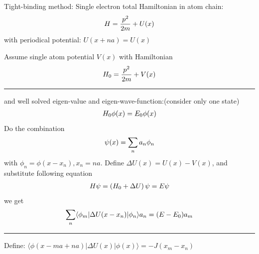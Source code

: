 \documentclass[letterpaper,10pt,english]{sphinxmanual}
\begin{document}
Tight-binding method: Single electron total Hamiltonian in atom chain:
\begin{gather}
\begin{split}H=\frac{p^2}{2m}+U(x)\end{split}\notag
\end{gather}
with periodical potential: \(U(x+na)=U(x)\)

Assume single atom potential \(V(x)\) with Hamiltonian
\begin{gather}
\begin{split}H_0=\frac{p^2}{2m}+V(x)\end{split}\notag
\end{gather}

\bigskip\hrule{}\bigskip


and well solved eigen-value and eigen-wave-function:(consider only one
state)
\begin{gather}
\begin{split}H_0\phi(x)=E_0\phi(x)\end{split}\notag
\end{gather}
Do the combination
\begin{gather}
\begin{split}\psi(x)=\sum\limits_n a_n\phi_n\end{split}\notag
\end{gather}
with \(\phi_n=\phi(x-x_n), x_n=na\). Define
\(\Delta U(x)=U(x)-V(x)\), and substitute following equation
\begin{gather}
\begin{split}H\psi=\left(H_0+\Delta U\right)\psi=E\psi\end{split}\notag
\end{gather}
we get
\begin{gather}
\begin{split}\sum_n \langle \phi_m|\Delta U(x-x_n)|\phi_n\rangle a_n=(E-E_0)a_m\end{split}\notag
\end{gather}

\bigskip\hrule{}\bigskip


Define:
\(\langle \phi(x-ma+na)|\Delta U(x) |\phi(x)\rangle=-J(x_m-x_n)\)
\end{document}
